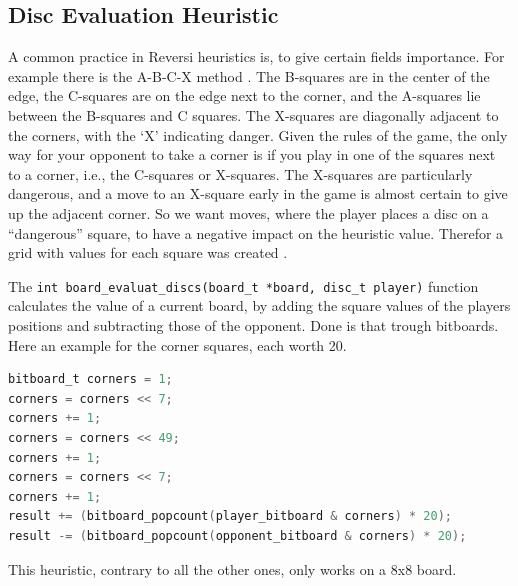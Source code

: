 \subsection{Disc Evaluation Heuristic}
A common practice in Reversi heuristics is, to give certain fields importance. For example there is the A-B-C-X method \cite{BrianRose}. The B-squares are in the center of the edge, the C-squares are on the edge next to the corner, and the A-squares lie between the B-squares and C squares. The X-squares are diagonally adjacent to the corners, with the ‘X’ indicating danger. Given the rules of the game, the only way for your opponent to take a corner is if you play in one of the squares next to a corner, i.e., the C-squares or X-squares. The X-squares are particularly dangerous, and a move to an X-square early in the game is almost certain to give up the adjacent corner. So we want moves, where the player places a disc on a “dangerous” square, to have a negative impact on the heuristic value. Therefor a grid with values for each square was created \cite{HeuristicEvaluation}.
\begin{center}
\end{center}
The \verb|int board_evaluat_discs(board_t *board, disc_t player)| function calculates the value of a current board, by adding the square values of the players positions and subtracting those of the opponent. Done is that trough bitboards. Here an example for the corner squares, each worth 20.
\begin{lstlisting}[language=c]
bitboard_t corners = 1;
corners = corners << 7;
corners += 1;
corners = corners << 49;
corners += 1;
corners = corners << 7;
corners += 1;
result += (bitboard_popcount(player_bitboard & corners) * 20);
result -= (bitboard_popcount(opponent_bitboard & corners) * 20);
\end{lstlisting}
This heuristic, contrary to all the other ones, only works on a 8x8 board.
